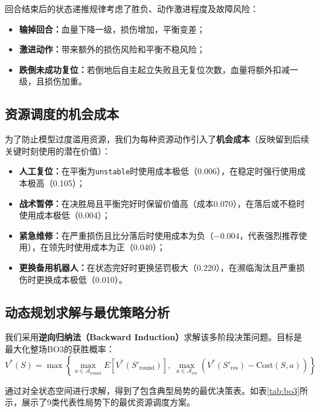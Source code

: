 \documentclass[a4paper,12pt]{article}
\numberwithin{equation}{section}
\numberwithin{table}{section}
\numberwithin{figure}{section}
\begin{document}
回合结束后的状态递推规律考虑了胜负、动作激进程度及故障风险：
\begin{itemize}
    \item \textbf{输掉回合：}血量下降一级，损伤增加，平衡变差；
    \item \textbf{激进动作：}带来额外的损伤风险和平衡不稳风险；
    \item \textbf{跌倒未成功复位：}若倒地后自主起立失败且无复位次数，血量将额外扣减一级，且损伤加重。
\end{itemize}

\subsection{资源调度的机会成本}

为了防止模型过度滥用资源，我们为每种资源动作引入了\textbf{机会成本}（反映留到后续关键时刻使用的潜在价值）：
\begin{itemize}
    \item \textbf{人工复位：}在平衡为\texttt{unstable}时使用成本极低（0.006），在稳定时强行使用成本极高（0.105）；
    \item \textbf{战术暂停：}在决胜局且平衡完好时保留价值高（成本0.070），在落后或不稳时使用成本极低（0.004）；
    \item \textbf{紧急维修：}在严重损伤且比分落后时使用成本为负（$-0.004$，代表强烈推荐使用），在领先时使用成本为正（0.040）；
    \item \textbf{更换备用机器人：}在状态完好时更换惩罚极大（0.220），在濒临淘汰且严重损伤时更换成本极低（0.010）。
\end{itemize}

\subsection{动态规划求解与最优策略分析}

我们采用\textbf{逆向归纳法（Backward Induction）}求解该多阶段决策问题。目标是最大化整场BO3的获胜概率：
\begin{equation}
    V^*(S) = \max \left\{ \max_{a \in \mathcal{A}_{\text{round}}} E\left[ V^*(S'_{\text{round}}) \right],\; \max_{a \in \mathcal{A}_{\text{res}}} \left( V^*(S'_{\text{res}}) - \text{Cost}(S, a) \right) \right\}
    \label{eq:dp}
\end{equation}

通过对全状态空间进行求解，得到了包含典型局势的最优决策表。如表\ref{tab:bo3}所示，展示了9类代表性局势下的最优资源调度方案。
\end{document}
